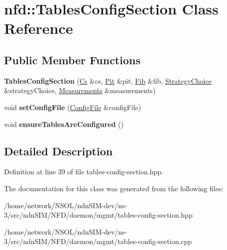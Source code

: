 \hypertarget{classnfd_1_1TablesConfigSection}{}\section{nfd\+:\+:Tables\+Config\+Section Class Reference}
\label{classnfd_1_1TablesConfigSection}
\subsection*{Public Member Functions}
\begin{DoxyCompactItemize}
\item 
{\bfseries Tables\+Config\+Section} (\hyperlink{classnfd_1_1cs_1_1Cs}{Cs} \&cs, \hyperlink{classnfd_1_1Pit}{Pit} \&pit, \hyperlink{classnfd_1_1Fib}{Fib} \&fib, \hyperlink{classnfd_1_1StrategyChoice}{Strategy\+Choice} \&strategy\+Choice, \hyperlink{classnfd_1_1Measurements}{Measurements} \&measurements)\hypertarget{classnfd_1_1TablesConfigSection_ad689680e38466c0e1098c7dd68fe4fd7}{}\label{classnfd_1_1TablesConfigSection_ad689680e38466c0e1098c7dd68fe4fd7}

\item 
void {\bfseries set\+Config\+File} (\hyperlink{classnfd_1_1ConfigFile}{Config\+File} \&config\+File)\hypertarget{classnfd_1_1TablesConfigSection_a66f2860b851736c29c7dca20a3c1896d}{}\label{classnfd_1_1TablesConfigSection_a66f2860b851736c29c7dca20a3c1896d}

\item 
void {\bfseries ensure\+Tables\+Are\+Configured} ()\hypertarget{classnfd_1_1TablesConfigSection_a203923eb9778cd0db782786ecb235772}{}\label{classnfd_1_1TablesConfigSection_a203923eb9778cd0db782786ecb235772}

\end{DoxyCompactItemize}


\subsection{Detailed Description}


Definition at line 39 of file tables-\/config-\/section.\+hpp.



The documentation for this class was generated from the following files\+:\begin{DoxyCompactItemize}
\item 
/home/network/\+N\+S\+O\+L/ndn\+S\+I\+M-\/dev/ns-\/3/src/ndn\+S\+I\+M/\+N\+F\+D/daemon/mgmt/tables-\/config-\/section.\+hpp\item 
/home/network/\+N\+S\+O\+L/ndn\+S\+I\+M-\/dev/ns-\/3/src/ndn\+S\+I\+M/\+N\+F\+D/daemon/mgmt/tables-\/config-\/section.\+cpp\end{DoxyCompactItemize}
